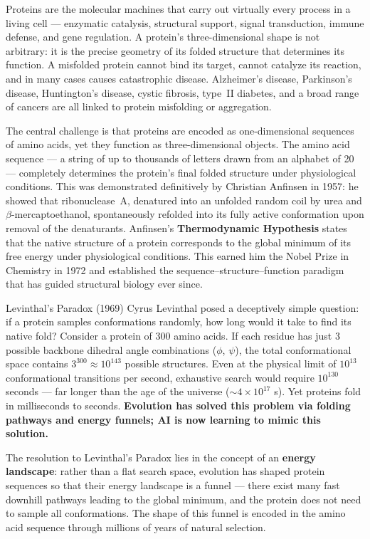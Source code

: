 ﻿\documentclass[12pt,a4paper]{article}
\begin{document}
Proteins are the molecular machines that carry out virtually every process in a living cell --- enzymatic catalysis, structural support, signal transduction, immune defense, and gene regulation. A protein's three-dimensional shape is not arbitrary: it is the precise geometry of its folded structure that determines its function. A misfolded protein cannot bind its target, cannot catalyze its reaction, and in many cases causes catastrophic disease. Alzheimer's disease, Parkinson's disease, Huntington's disease, cystic fibrosis, type~II diabetes, and a broad range of cancers are all linked to protein misfolding or aggregation.

The central challenge is that proteins are encoded as one-dimensional sequences of amino acids, yet they function as three-dimensional objects. The amino acid sequence --- a string of up to thousands of letters drawn from an alphabet of 20 --- completely determines the protein's final folded structure under physiological conditions. This was demonstrated definitively by Christian Anfinsen in 1957: he showed that ribonuclease~A, denatured into an unfolded random coil by urea and $\beta$-mercaptoethanol, spontaneously refolded into its fully active conformation upon removal of the denaturants. Anfinsen's \textbf{Thermodynamic Hypothesis} states that the native structure of a protein corresponds to the global minimum of its free energy under physiological conditions. This earned him the Nobel Prize in Chemistry in 1972 and established the sequence--structure--function paradigm that has guided structural biology ever since.

\begin{keybox}{Levinthal's Paradox (1969)}
Cyrus Levinthal posed a deceptively simple question: if a protein samples conformations randomly, how long would it take to find its native fold? Consider a protein of 300 amino acids. If each residue has just 3 possible backbone dihedral angle combinations ($\phi$, $\psi$), the total conformational space contains $3^{300} \approx 10^{143}$ possible structures. Even at the physical limit of $10^{13}$ conformational transitions per second, exhaustive search would require $10^{130}$ seconds --- far longer than the age of the universe ($\sim 4 \times 10^{17}$ s). Yet proteins fold in milliseconds to seconds. \textbf{Evolution has solved this problem via folding pathways and energy funnels; AI is now learning to mimic this solution.}
\end{keybox}

The resolution to Levinthal's Paradox lies in the concept of an \textbf{energy landscape}: rather than a flat search space, evolution has shaped protein sequences so that their energy landscape is a funnel --- there exist many fast downhill pathways leading to the global minimum, and the protein does not need to sample all conformations. The shape of this funnel is encoded in the amino acid sequence through millions of years of natural selection.
\end{document}
